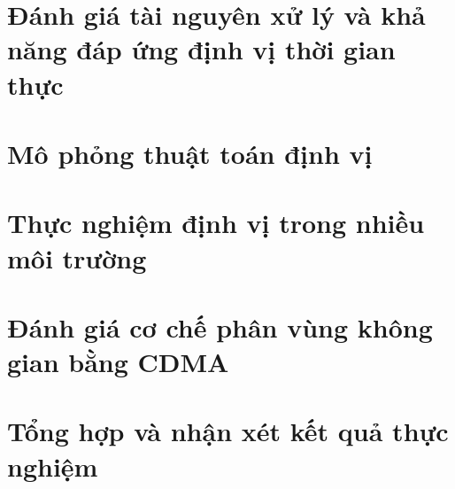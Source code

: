 \documentclass[
  a4paper,
]{report}
\begin{document}
\section{Đánh giá tài nguyên xử lý và khả năng đáp ứng định vị thời gian thực}

\section{Mô phỏng thuật toán định vị}

\section{Thực nghiệm định vị trong nhiều môi trường}

\section{Đánh giá cơ chế phân vùng không gian bằng CDMA}

\section{Tổng hợp và nhận xét kết quả thực nghiệm}
\end{document}
